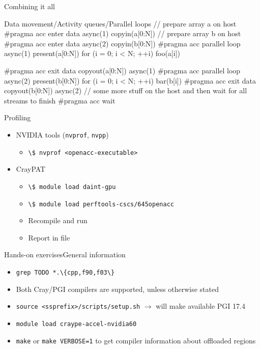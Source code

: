 \documentclass[12pt,aspectratio=169]{beamer}
\newcommand\shinline[2][]{\lstinline[style=shstyle,basicstyle=\ttfamily,#1]!#2!}
\begin{document}
\begin{frame}[fragile]{Combining it all}
  \begin{Cpplisting}{Data movement/Activity queues/Parallel loops}
// prepare array a on host
#pragma acc enter data async(1) copyin(a[0:N])
// prepare array b on host
#pragma acc enter data async(2) copyin(b[0:N])
#pragma acc parallel loop async(1) present(a[0:N])
for (i = 0; i < N; ++i)
    foo(a[i])

#pragma acc exit data copyout(a[0:N]) async(1)
#pragma acc parallel loop async(2) present(b[0:N])
for (i = 0; i < N; ++i)
    bar(b[i])
#pragma acc exit data copyout(b[0:N]) async(2)
// some more stuff on the host and then wait for all streams to finish
#pragma acc wait

  \end{Cpplisting}
\end{frame}

\begin{frame}[fragile]{Profiling}
  \begin{itemize}
  \item NVIDIA tools (\shinline{nvprof}, \shinline{nvpp})
    \begin{itemize}
    \item \shinline{\$ nvprof <openacc-executable>}
    \end{itemize}
    \vspace\baselineskip
  \item CrayPAT
    \begin{itemize}
    \item \shinline{\$ module load daint-gpu}
    \item \shinline{\$ module load perftools-cscs/645openacc}
    \item Recompile and run
    \item Report in  file
    \end{itemize}
  \end{itemize}
\end{frame}

\begin{frame}[fragile]{Hands-on exercises}{General information}
  \begin{itemize}
  \item \shinline{grep TODO *.\{cpp,f90,f03\}}
  \item Both Cray/PGI compilers are supported, unless otherwise stated
  \item \shinline{source <ssprefix>/scripts/setup.sh} $\rightarrow$ will make available PGI 17.4
  \item \shinline{module load craype-accel-nvidia60}
  \item \shinline{make} or \shinline{make VERBOSE=1} to get compiler information about offloaded regions
  \end{itemize}
\end{frame}
\end{document}
